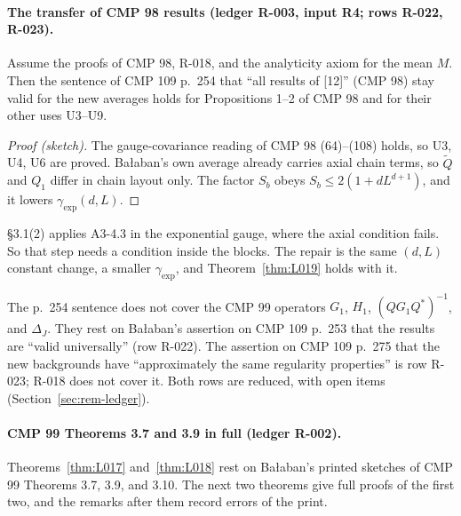 \paragraph{The transfer of CMP 98 results (ledger R-003, input R4; rows R-022, R-023).}
\begin{proposition}\label{prop:L043}
Assume the proofs of CMP 98, R-018, and the analyticity axiom for the mean $M$. Then the sentence of CMP 109 p.~254 that ``all results of [12]'' (CMP 98) stay valid for the new averages holds for Propositions 1--2 of CMP 98 and for their other uses U3--U9.
\end{proposition}
\begin{proof}[Proof (sketch)]
The gauge-covariance reading of CMP 98 (64)--(108) holds, so U3, U4, U6 are proved. Ba{\l}aban's own average already carries axial chain terms, so $\tilde Q$ and $Q_1$ differ in chain layout only. The factor $S_b$ obeys $S_b\le2(1+dL^{d+1})$, and it lowers $\gamma_{\exp}(d,L)$.
\end{proof}
\begin{remark}
 \S3.1(2) applies A3-4.3 in the exponential gauge, where the axial condition fails. So that step needs a condition inside the blocks. The repair is the same $(d,L)$ constant change, a smaller $\gamma_{\exp}$, and Theorem~\ref{thm:L019} holds with it.
\end{remark}
The p.~254 sentence does not cover the CMP 99 operators $G_1$, $H_1$, $(QG_1Q^*)^{-1}$, and $\Delta_J$. They rest on Ba{\l}aban's assertion on CMP 109 p.~253 that the results are ``valid universally'' (row R-022). The assertion on CMP 109 p.~275 that the new backgrounds have ``approximately the same regularity properties'' is row R-023; R-018 does not cover it. Both rows are reduced, with open items (Section~\ref{sec:rem-ledger}).

\paragraph{CMP 99 Theorems 3.7 and 3.9 in full (ledger R-002).}
Theorems~\ref{thm:L017} and~\ref{thm:L018} rest on Ba{\l}aban's printed sketches of CMP 99 Theorems 3.7, 3.9, and 3.10. The next two theorems give full proofs of the first two, and the remarks after them record errors of the print.

